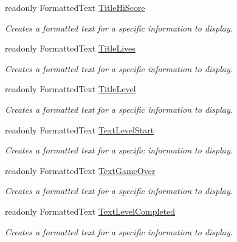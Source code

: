 \begin{DoxyCompactItemize}
readonly Formatted\+Text \mbox{\hyperlink{class_o_e_invaders_1_1_library_1_1_text_storage_a83016c1630792fed13e4fdaa523938ee}{Title\+Hi\+Score}}
\begin{DoxyCompactList}\small\item\em Creates a formatted text for a specific information to display. \end{DoxyCompactList}\item 
readonly Formatted\+Text \mbox{\hyperlink{class_o_e_invaders_1_1_library_1_1_text_storage_a95d39ac3053701180cd99e50731f012e}{Title\+Lives}}
\begin{DoxyCompactList}\small\item\em Creates a formatted text for a specific information to display. \end{DoxyCompactList}\item 
readonly Formatted\+Text \mbox{\hyperlink{class_o_e_invaders_1_1_library_1_1_text_storage_a4d4079c92d3d04778544e5f63911a39d}{Title\+Level}}
\begin{DoxyCompactList}\small\item\em Creates a formatted text for a specific information to display. \end{DoxyCompactList}\item 
readonly Formatted\+Text \mbox{\hyperlink{class_o_e_invaders_1_1_library_1_1_text_storage_aec4c229e75e27ba3a5c2b52c18b5a263}{Text\+Level\+Start}}
\begin{DoxyCompactList}\small\item\em Creates a formatted text for a specific information to display. \end{DoxyCompactList}\item 
readonly Formatted\+Text \mbox{\hyperlink{class_o_e_invaders_1_1_library_1_1_text_storage_a8821014eda892c79ebdc4e7d894cd137}{Text\+Game\+Over}}
\begin{DoxyCompactList}\small\item\em Creates a formatted text for a specific information to display. \end{DoxyCompactList}\item 
readonly Formatted\+Text \mbox{\hyperlink{class_o_e_invaders_1_1_library_1_1_text_storage_aff0410363c37b97478b63341b683d58d}{Text\+Level\+Completed}}
\begin{DoxyCompactList}\small\item\em Creates a formatted text for a specific information to display. \end{DoxyCompactList}\item 

\end{DoxyCompactItemize}
